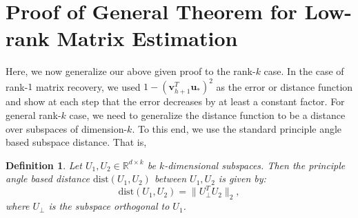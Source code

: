 \documentclass[11pt]{article}
\newtheorem{defn}[lemma]{Definition}
\newcommand{\tp}[1]{{#1}^{T}}
\newcommand{\dist}{\mathrm{dist}}
\renewcommand{\u}{\bm{u}}
\renewcommand{\v}{\bm{v}}
\newcommand{\vtnt}{\tp{\v}_{h+1}}
\newcommand{\uo}{\u_* }
\begin{document}
\section{Proof of General Theorem for Low-rank Matrix Estimation}\label{app:general}
Here, we now generalize our above given proof to the rank-$k$ case. In the case of rank-$1$ matrix recovery, we used $1-(\vtnt\uo)^2$ as the error or distance function and show at each step that the error decreases by at least a constant factor. For general rank-$k$ case, we need to generalize the distance function to be a distance over subspaces of dimension-$k$. To this end, we use the standard principle angle based subspace distance. That is,
\begin{defn}
  Let $U_1, U_2 \in \mathbb{R}^{d\times k}$ be $k$-dimensional subspaces. Then the principle angle based distance $\dist(U_1, U_2)$ between $U_1, U_2$ is given by: $$\dist(U_1, U_2)=\|U_\perp^TU_2\|_2,$$ where $U_\perp$ is the subspace orthogonal to $U_1$. 
\end{defn}
\end{document}
